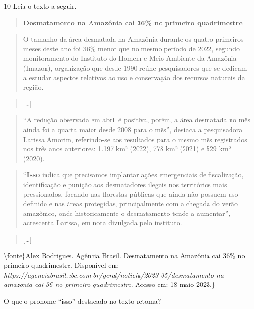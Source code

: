 \num{10} Leia o texto a seguir.

\begin{quote}
\textbf{Desmatamento na Amazônia cai 36\% no primeiro quadrimestre}
\end{quote}

\begin{quote}
O tamanho da área desmatada na Amazônia durante os quatro primeiros
meses deste ano foi 36\% menor que no mesmo período de 2022, segundo
monitoramento do Instituto do Homem e Meio Ambiente da Amazônia
(Imazon), organização que desde 1990 reúne pesquisadores que se dedicam
a estudar aspectos relativos ao uso e conservação dos recursos naturais
da região.
\end{quote}

\begin{quote}
{[}\ldots{]}
\end{quote}

\begin{quote}
``A redução observada em abril é positiva, porém, a área desmatada no
mês ainda foi a quarta maior desde 2008 para o mês'', destaca a
pesquisadora Larissa Amorim, referindo-se aos resultados para o mesmo
mês registrados nos três anos anteriores: 1.197 km² (2022), 778 km²
(2021) e 529 km² (2020).
\end{quote}

\begin{quote}
``\textbf{Isso} indica que precisamos implantar ações emergenciais de
fiscalização, identificação e punição aos desmatadores ilegais nos
territórios mais pressionados, focando nas florestas públicas que ainda
não possuem uso definido e nas áreas protegidas, principalmente com a
chegada do verão amazônico, onde historicamente o desmatamento tende a
aumentar'', acrescenta Larissa, em nota divulgada pelo instituto.
\end{quote}

\begin{quote}
{[}\ldots{]}
\end{quote}

\textbackslash fonte\{Alex Rodrigues. Agência Brasil. Desmatamento na
Amazônia cai 36\% no primeiro quadrimestre. Disponível em:
\emph{https://agenciabrasil.ebc.com.br/geral/noticia/2023-05/desmatamento-na-amazonia-cai-36-no-primeiro-quadrimestre}.
Acesso em: 18 maio 2023.\}

O que o pronome ``isso'' destacado no texto retoma?



